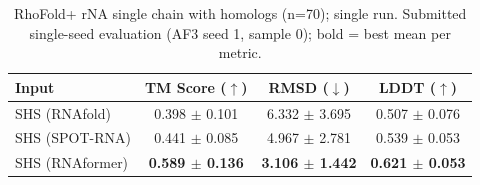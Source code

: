 \begin{table}[htbp]
\centering
\caption{RhoFold+ rNA single chain with homologs (n=70); single run. Submitted single-seed evaluation (AF3 seed 1, sample 0); bold = best mean per metric.}
\label{tab:rf_rna_single_chain_with_homologs}
\begin{tabular}{lccc}
\toprule
Input & TM Score ($\uparrow$) & RMSD ($\downarrow$) & LDDT ($\uparrow$) \\
\midrule
SHS (RNAfold) & 0.398 $\pm$ 0.101 & 6.332 $\pm$ 3.695 & 0.507 $\pm$ 0.076 \\
SHS (SPOT-RNA) & 0.441 $\pm$ 0.085 & 4.967 $\pm$ 2.781 & 0.539 $\pm$ 0.053 \\
SHS (RNAformer) & \textbf{0.589 $\pm$ 0.136} & \textbf{3.106 $\pm$ 1.442} & \textbf{0.621 $\pm$ 0.053} \\
\bottomrule
\end{tabular}
\end{table}
